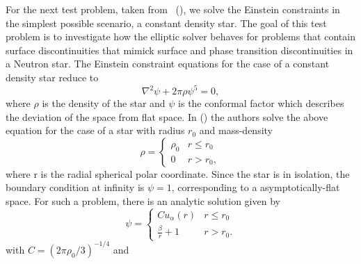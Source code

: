 For the next test problem, taken from ~(\cite{baumgarte2007}),  we solve the Einstein constraints in the simplest possible scenario, a constant density star. The goal of this test problem is to investigate how the elliptic solver behaves for problems that contain surface discontinuities that mimick surface and phase transition discontinuities in a Neutron star. The Einstein constraint equations for the case of a constant density star reduce to
%
%
\begin{equation}
\label{eq:Constant_Density_Star_PDE}
 \nabla^{2}\psi + 2\pi \rho \psi^{5} = 0,
\end{equation}
%
where $\rho$ is the density of the star and $\psi$ is the conformal factor which describes the deviation of the space from flat space. In (\cite{baumgarte2007}) the authors solve the above equation for the case of a star with radius $r_0$ and mass-density
%
\begin{equation}
\rho = \begin{cases} 
      \rho_{0} & r\leq r_0 \\
      0 & r > r_0,
   \end{cases}
\end{equation}
%
where r is the radial spherical polar coordinate. Since the star is in isolation, the boundary condition at infinity is $\psi = 1$, corresponding to a asymptotically-flat space. For such a problem, there is an analytic solution given by
%
\begin{equation}
\psi = \begin{cases} 
      Cu_{\alpha}(r) & r\leq r_0 \\
     \frac{\beta}{r} + 1 & r > r_0.
   \end{cases}
\end{equation}
%
with $C=(2\pi\rho_{0}/3)^{-1/4}$ and

